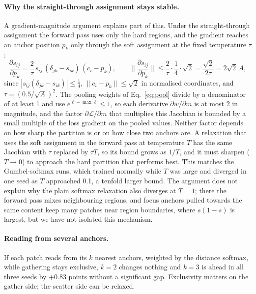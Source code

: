 \documentclass[10pt]{article}
\begin{document}
\paragraph{Why the straight-through assignment stays stable.} A gradient-magnitude argument
explains part of this. Under the straight-through assignment the forward pass uses only the
hard regions, and the gradient reaches an anchor position $p_k$ only through the soft
assignment at the fixed temperature $\tau$:
\begin{equation}
\frac{\partial s_{ij}}{\partial p_k}=\frac{2}{\tau}\,s_{ij}\,(\delta_{jk}-s_{ik})\,(c_i-p_k),
\qquad
\Big\|\frac{\partial s_{ij}}{\partial p_k}\Big\|\le\frac{2}{\tau}\cdot\frac14\cdot\sqrt2
=\frac{\sqrt2}{2\tau}=2\sqrt2\,A ,
\label{eq:stbound}
\end{equation}
since $|s_{ij}(\delta_{jk}-s_{ik})|\le\frac14$, $\|c_i-p_k\|\le\sqrt2$ in normalised
coordinates, and $\tau=(0.5/\sqrt A)^2$. The pooling weights of Eq.~\ref{eq:pool} divide by a
denominator of at least 1 and use $e^{\ell-\max\ell}\le1$, so each derivative
$\partial w/\partial m$ is at most 2 in magnitude, and the factor $\partial\mathcal{L}/\partial m$
that multiplies this Jacobian is bounded by a small multiple of the loss gradient on the pooled
values. Neither factor depends
on how sharp the partition is or on how close two anchors are. A relaxation that uses the soft
assignment in the forward pass at temperature $T$ has the same Jacobian with $\tau$ replaced by
$\tau T$, so its bound grows as $1/T$, and it must sharpen ($T\to0$) to approach the hard
partition that performs best. This matches the Gumbel-softmax runs, which trained normally
while $T$ was large and diverged in one seed as $T$ approached 0.1, a tenfold larger bound. The
argument does not explain why the plain softmax relaxation also diverges at $T=1$; there the
forward pass mixes neighbouring regions, and focus anchors pulled towards the same content keep
many patches near region boundaries, where $s(1-s)$ is largest, but we have not isolated this
mechanism.

\paragraph{Reading from several anchors.} If each patch reads from its $k$ nearest anchors,
weighted by the distance softmax, while gathering stays exclusive, $k=2$ changes nothing and
$k=3$ is ahead in all three seeds by +0.83 points without a significant gap. Exclusivity matters
on the gather side; the scatter side can be relaxed.
\end{document}
